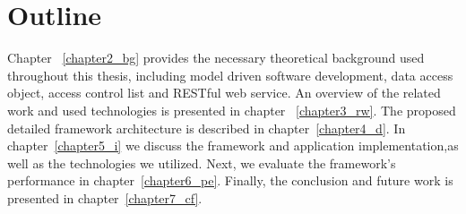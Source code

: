 \section{Outline}
Chapter ~\ref{chapter2_bg} provides the necessary theoretical background used throughout this thesis, including model driven software development, data access object, access control list and RESTful web service. An overview of the related work and used technologies is presented in chapter ~\ref{chapter3_rw}. The proposed detailed framework architecture is described in chapter~\ref{chapter4_d}. In chapter~\ref{chapter5_i} we discuss the framework and application implementation,as well as the technologies we utilized. Next, we evaluate the framework's performance in chapter~\ref{chapter6_pe}. Finally, the conclusion and future work is presented in chapter~\ref{chapter7_cf}.